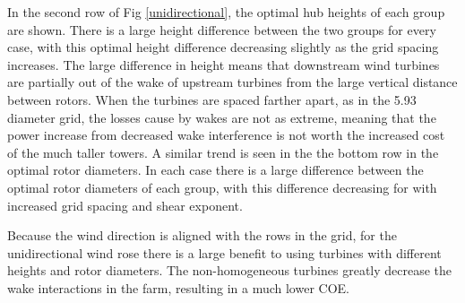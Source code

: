 \documentclass[conf]{new-aiaa}
\begin{document}

In the second row of Fig \ref{unidirectional}, the optimal hub heights of each group are shown. There is a large height difference between the two groups for every case, with this optimal height difference decreasing slightly as the grid spacing increases. The large difference in height means that downstream wind turbines are partially out of the wake of upstream turbines from the large vertical distance between rotors. When the turbines are spaced farther apart, as in the 5.93 diameter grid, the losses cause by wakes are not as extreme, meaning that the power increase from decreased wake interference is not worth the increased cost of the much taller towers.
A similar trend is seen in the the bottom row in the optimal rotor diameters. In each case there is a large difference between the optimal rotor diameters of each group, with this difference decreasing for with increased grid spacing and shear exponent.

Because the wind direction is aligned with the rows in the grid, for the unidirectional wind rose there is a large benefit to using turbines with different heights and rotor diameters. The non-homogeneous turbines greatly decrease the wake interactions in the farm, resulting in a much lower COE. 




    
\end{document}
